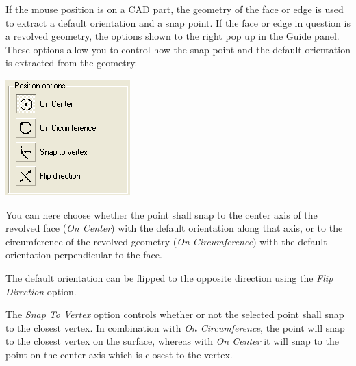 \noindent
\begin{minipage}{0.75\textwidth}
  \raggedright
  If the mouse position is on a CAD part, the geometry of the face or edge
  is used to extract a default orientation and a snap point.
  If the face or edge in question is a revolved geometry,
  the options shown to the right pop up in the Guide panel.
  These options allow you to control how the snap point and
  the default orientation is extracted from the geometry.
\end{minipage}%
\begin{minipage}{0.25\textwidth}
  \includegraphics[width=\textwidth]{Figures/3-SnapPanel}
\end{minipage}

You can here choose whether the point shall snap to the center axis of the
revolved face ({\sl On Center}) with the default orientation along that axis,
or to the circumference of the revolved geometry ({\sl On Circumference})
with the default orientation perpendicular to the face.

The default orientation can be flipped to the opposite direction using
the {\sl Flip Direction} option.

The {\sl Snap To Vertex} option controls whether or not the selected point shall
snap to the closest vertex. In combination with {\sl On Circumference},
the point will snap to the closest vertex on the surface,
whereas with {\sl On Center} it will snap to the point on the center axis
which is closest to the vertex.

